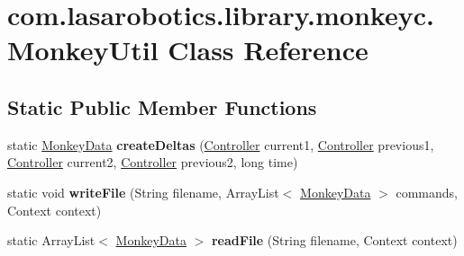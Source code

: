 \hypertarget{classcom_1_1lasarobotics_1_1library_1_1monkeyc_1_1_monkey_util}{}\section{com.\+lasarobotics.\+library.\+monkeyc.\+Monkey\+Util Class Reference}
\label{classcom_1_1lasarobotics_1_1library_1_1monkeyc_1_1_monkey_util}
\subsection*{Static Public Member Functions}
\begin{DoxyCompactItemize}
\item 
\hypertarget{classcom_1_1lasarobotics_1_1library_1_1monkeyc_1_1_monkey_util_ad53a6656de74281de2c0e32b0a7a04f5}{}static \hyperlink{classcom_1_1lasarobotics_1_1library_1_1monkeyc_1_1_monkey_data}{Monkey\+Data} {\bfseries create\+Deltas} (\hyperlink{classcom_1_1lasarobotics_1_1library_1_1controller_1_1_controller}{Controller} current1, \hyperlink{classcom_1_1lasarobotics_1_1library_1_1controller_1_1_controller}{Controller} previous1, \hyperlink{classcom_1_1lasarobotics_1_1library_1_1controller_1_1_controller}{Controller} current2, \hyperlink{classcom_1_1lasarobotics_1_1library_1_1controller_1_1_controller}{Controller} previous2, long time)\label{classcom_1_1lasarobotics_1_1library_1_1monkeyc_1_1_monkey_util_ad53a6656de74281de2c0e32b0a7a04f5}

\item 
\hypertarget{classcom_1_1lasarobotics_1_1library_1_1monkeyc_1_1_monkey_util_a110938b02fc52187735d141c7099b9ec}{}static void {\bfseries write\+File} (String filename, Array\+List$<$ \hyperlink{classcom_1_1lasarobotics_1_1library_1_1monkeyc_1_1_monkey_data}{Monkey\+Data} $>$ commands, Context context)\label{classcom_1_1lasarobotics_1_1library_1_1monkeyc_1_1_monkey_util_a110938b02fc52187735d141c7099b9ec}

\item 
\hypertarget{classcom_1_1lasarobotics_1_1library_1_1monkeyc_1_1_monkey_util_a957c31e9a0f2a187d1e87540b94a88d9}{}static Array\+List$<$ \hyperlink{classcom_1_1lasarobotics_1_1library_1_1monkeyc_1_1_monkey_data}{Monkey\+Data} $>$ {\bfseries read\+File} (String filename, Context context)\label{classcom_1_1lasarobotics_1_1library_1_1monkeyc_1_1_monkey_util_a957c31e9a0f2a187d1e87540b94a88d9}

\end{DoxyCompactItemize}
